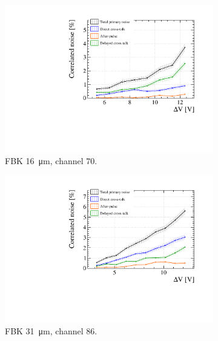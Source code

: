 \begin{figure}[htbp]
  \centering
  \begin{subfigure}{0.48\textwidth}
    \includegraphics[width=1\linewidth]{gfx/plots/WA/16/CorrelatedNoise.pdf}
    \caption{FBK \SI{16}{\micro m}, channel $70$.}
    \label{fig:}
  \end{subfigure}
  \hfill
  \begin{subfigure}{0.48\textwidth}
    \includegraphics[width=1\linewidth]{gfx/plots/WA/31/CorrelatedNoise.pdf}
    \caption{FBK \SI{31}{\micro m}, channel $86$.}
    \label{fig:}
  \end{subfigure}
  \hfill
  \begin{subfigure}{0.48\textwidth}

\end{subfigure}
\end{figure}
